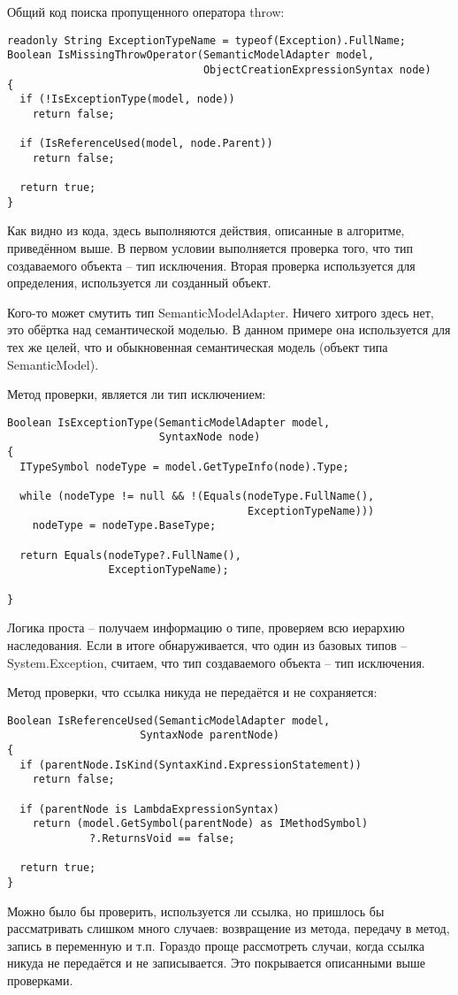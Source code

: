 \documentclass{article}
\begin{document}
Общий код поиска пропущенного оператора throw:
\begin{lstlisting}
readonly String ExceptionTypeName = typeof(Exception).FullName;
Boolean IsMissingThrowOperator(SemanticModelAdapter model,        
                               ObjectCreationExpressionSyntax node)
{           
  if (!IsExceptionType(model, node))
    return false;

  if (IsReferenceUsed(model, node.Parent))
    return false;

  return true; 
}
\end{lstlisting}
Как видно из кода, здесь выполняются действия, описанные в алгоритме, приведённом выше. В первом условии выполняется проверка того, что тип создаваемого объекта – тип исключения. Вторая проверка используется для определения, используется ли созданный объект.

Кого-то может смутить тип SemanticModelAdapter. Ничего хитрого здесь нет, это обёртка над семантической моделью. В данном примере она используется для тех же целей, что и обыкновенная семантическая модель (объект типа SemanticModel).

Метод проверки, является ли тип исключением:
\begin{lstlisting}
Boolean IsExceptionType(SemanticModelAdapter model,
                        SyntaxNode node)
{
  ITypeSymbol nodeType = model.GetTypeInfo(node).Type;

  while (nodeType != null && !(Equals(nodeType.FullName(),
                                      ExceptionTypeName)))
    nodeType = nodeType.BaseType;

  return Equals(nodeType?.FullName(),
                ExceptionTypeName);

}
\end{lstlisting}
Логика проста – получаем информацию о типе, проверяем всю иерархию наследования. Если в итоге обнаруживается, что один из базовых типов – System.Exception, считаем, что тип создаваемого объекта – тип исключения.

Метод проверки, что ссылка никуда не передаётся и не сохраняется:
\begin{lstlisting}
Boolean IsReferenceUsed(SemanticModelAdapter model, 
                     SyntaxNode parentNode)
{
  if (parentNode.IsKind(SyntaxKind.ExpressionStatement))
    return false;

  if (parentNode is LambdaExpressionSyntax)
    return (model.GetSymbol(parentNode) as IMethodSymbol)
             ?.ReturnsVoid == false;

  return true;
} 
\end{lstlisting}
Можно было бы проверить, используется ли ссылка, но пришлось бы рассматривать слишком много случаев: возвращение из метода, передачу в метод, запись в переменную и т.п. Гораздо проще рассмотреть случаи, когда ссылка никуда не передаётся и не записывается. Это покрывается описанными выше проверками.
\end{document}
